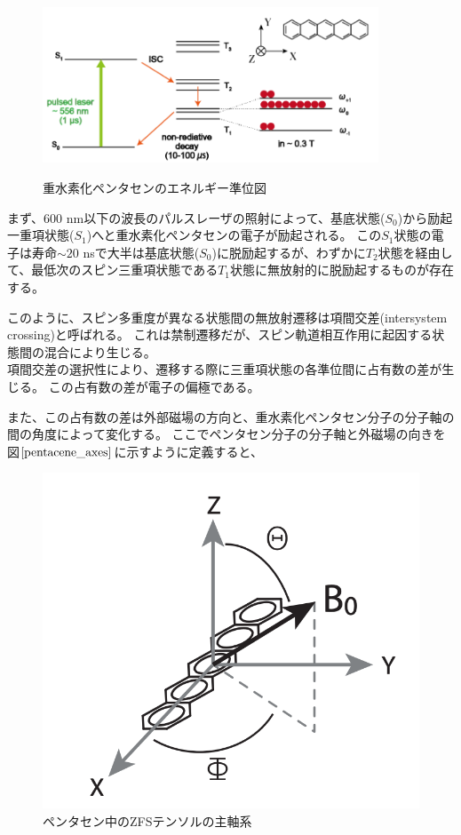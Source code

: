 \begin{figure}[tbp]
  \centering
  \includegraphics[clip,width=10cm]{./chap2/fig/triplet_state.png}\\
  \caption{重水素化ペンタセンのエネルギー準位図}
  \label{triplet_state}
\end{figure}

まず、600 nm以下の波長のパルスレーザの照射によって、基底状態($S_0$)から励起一重項状態($S_1$)へと重水素化ペンタセンの電子が励起される。
この$S_1$状態の電子は寿命$\sim 20$ nsで大半は基底状態($S_0$)に脱励起するが、わずかに$T_2$状態を経由して、最低次のスピン三重項状態である$T_1$状態に無放射的に脱励起するものが存在する。

このように、スピン多重度が異なる状態間の無放射遷移は項間交差(intersystem crossing)と呼ばれる。
これは禁制遷移だが、スピン軌道相互作用に起因する状態間の混合により生じる。\\
項間交差の選択性により、遷移する際に三重項状態の各準位間に占有数の差が生じる。
この占有数の差が電子の偏極である。

また、この占有数の差は外部磁場の方向と、重水素化ペンタセン分子の分子軸の間の角度によって変化する。
ここでペンタセン分子の分子軸と外磁場の向きを図$\ref{pentacene_axes}$に示すように定義すると、


\begin{figure}[ht]
  \centering
  \includegraphics[keepaspectratio, scale=0.5]
       {./chap2/fig/pentacene_axes.png}
  \caption{ペンタセン中のZFSテンソルの主軸系}
  \label{pentacene_axes}
 \end{figure}

